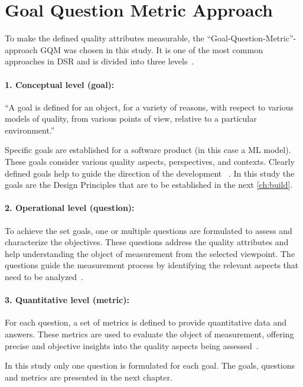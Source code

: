 \section{Goal Question Metric Approach}\label{sec:goal-question-metric-approach}
To make the defined quality attributes measurable, the ``Goal-Question-Metric''-approach \ac{GQM}
was chosen in this study.
It is one of the most common approaches in DSR and is divided into three levels~\cite[p. 3]{basili_goalquestionmetric_}.

\paragraph{1. Conceptual level (goal):}
``A goal is defined for an object, for a variety of reasons,
with respect to various models of quality, from various points of view, relative to a
particular environment.''
~\cite[p. 3]{basili_goalquestionmetric_}

Specific goals are established for a software product (in this case a \ac{ML} model).
These goals consider various quality aspects, perspectives, and contexts.
Clearly defined goals help to guide the direction of the development
~\cite[p. 3]{basili_goalquestionmetric_}.
In this study the goals are the Design Principles that are to be established in the next \cref{ch:build}.

\paragraph{2. Operational level (question):}
To achieve the set goals, one or multiple questions are formulated to assess and characterize the objectives.
These questions address the quality attributes and help understanding the object of measurement from the selected
viewpoint.
The questions guide the measurement process by identifying the relevant aspects that need to be
analyzed~\cite[p. 3]{basili_goalquestionmetric_}.

\paragraph{3. Quantitative level (metric):}
For each question, a set of metrics is defined to provide quantitative data and answers.
These metrics are used to evaluate the object of measurement, offering precise and objective insights into the
quality aspects being assessed~\cite[p. 3]{basili_goalquestionmetric_}.

In this study only one question is formulated for each goal.
The goals, questions and metrics are presented in the next chapter.
